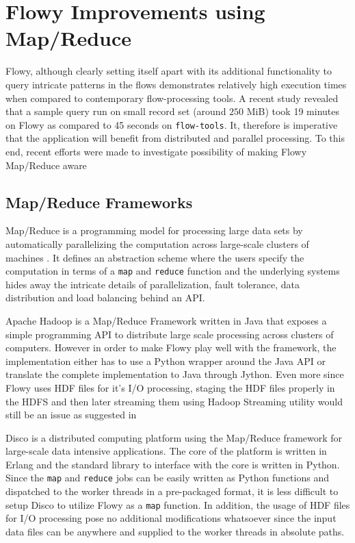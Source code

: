 \chapter{Flowy Improvements using Map/Reduce}\label{ch:flowy-mapreduce}

Flowy, although clearly setting itself apart with its additional functionality
to query intricate patterns in the flows demonstrates relatively high
execution times when compared to contemporary flow-processing tools. A recent
study \cite{pnemeth:thesis:2010} revealed that a sample query run on small
record set (around $250$ MiB) took 19 minutes on Flowy as compared to 45 seconds
on \texttt{flow-tools}. It, therefore is imperative that the application will
benefit from distributed and parallel processing. To this end, recent efforts
were made to investigate possibility of making Flowy Map/Reduce aware
\cite{pnemeth:thesis:2010}

\section{Map/Reduce Frameworks}\label{sec:map-reduce}

Map/Reduce is a programming model for processing large data sets by
automatically parallelizing the computation across large-scale clusters of
machines \cite{jdean:2004}. It defines an abstraction scheme where the users
specify the computation in terms of a \texttt{map} and \texttt{reduce}
function and the underlying systems hides away the intricate details of
parallelization, fault tolerance, data distribution and load balancing behind
an \ac{API}.

Apache Hadoop \cite{twhite:hadoop:2010} is a Map/Reduce Framework written in
Java that exposes a simple programming API to distribute large scale
processing across clusters of computers.  However in order to make Flowy play
well with the framework, the implementation either has to use a Python wrapper
around  the Java \ac{API} or translate the complete
implementation to Java through Jython. Even more since Flowy uses \ac{HDF}
files for it's I/O processing, staging the \ac{HDF} files properly in the
\ac{HDFS} \cite{kshvachko:2010} and then later streaming them using Hadoop
Streaming utility would still be an issue as suggested in
\cite{pnemeth:thesis:2010}

Disco \cite{pmundkur:2011} is a distributed computing platform using the
Map/Reduce framework for large-scale data intensive applications. The core of
the platform is written in Erlang and the standard library to interface with
the core is written in Python. Since the \texttt{map} and \texttt{reduce} jobs
can be easily  written as Python functions and
dispatched to the worker threads in a pre-packaged format, it is less
difficult to setup Disco to utilize Flowy as a \texttt{map} function. In
addition, the usage of \ac{HDF} files for I/O processing pose no additional
modifications whatsoever since the input data files can be anywhere and
supplied to the worker threads in absolute paths.


